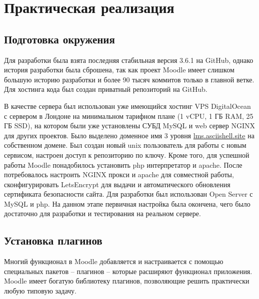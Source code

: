 \documentclass[a4paper,14pt]{article}
\begin{document}









\section{Практическая реализация}
\subsection{Подготовка окружения}

Для разработки была взята последняя стабильная версия 3.6.1 на GitHub, однако история разработки была сброшена, так как проект Moodle имеет слишком большую историю разработки и более 90 тысяч коммитов только в главной ветке.
Для хостинга кода был создан приватный репозиторий на GitHub.

В качестве сервера был использован уже имеющийся хостинг VPS DigitalOcean с сервером в Лондоне на минимальном тарифном плане (1 vCPU, 1 ГБ RAM, 25 ГБ SSD), на котором были уже установлены СУБД MySQL и web сервер NGINX для других проектов.
Было выделено доменное имя 3 уровня \url{lms.asciishell.site} на собственном домене.
Был создан новый unix пользователь для работы с новым сервисом, настроен доступ к репозиторию по ключу.
Кроме того, для успешной работы Moodle понадобилось установить php интерпретатор и apache. 
После потребовалось настроить NGINX прокси и apache для совместной работы, сконфигурировать LetsEncrypt для выдачи и автоматического обновления сертификата безопасности сайта.
Для разработки был использован Open Server с MySQL и php.
На данном этапе первичная настройка была окончена, чего было достаточно для разработки и тестирования на реальном сервере.

\subsection{Установка плагинов}

Многий функционал в Moodle добавляется и настраивается с помощью специальных пакетов -- плагинов -- которые расширяют функционал приложения.
Moodle имеет богатую библиотеку плагинов, позволяющие решить практически любую типовую задачу.
\end{document}
